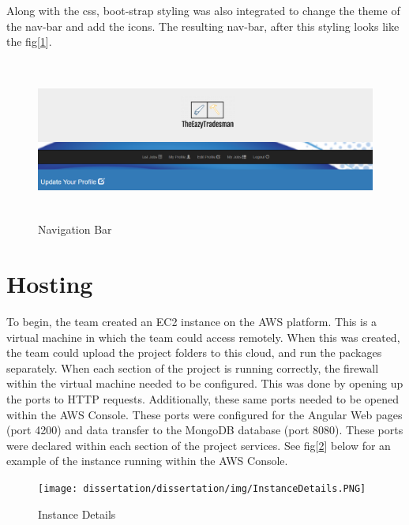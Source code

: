 \bigskip

Along with the css, boot-strap styling was also integrated to change the theme of the nav-bar and add the icons. The resulting nav-bar, after this styling looks like the fig[\ref{fig:nav}]. 

\begin{figure}[H]
    \centering
    \includegraphics[width=\textwidth, height=150pt]{DesignImages/navBar.PNG}
    \caption{Navigation Bar}
    \label{fig:nav}
\end{figure}

\bigskip



\section{Hosting}
\label{sec:SystemDesignHosting}
To begin, the team created an EC2 instance on the AWS platform. This is a virtual machine in which the team could access remotely. When this was created, the team could upload the project folders to this cloud, and run the packages separately. When each section of the project is running correctly, the firewall within the virtual machine needed to be configured. This was done by opening up the ports to HTTP requests. Additionally, these same ports needed to be opened within the AWS Console. These ports were configured for the Angular Web pages (port 4200) and data transfer to the MongoDB database (port 8080). These ports were declared within each section of the project services. See fig[\ref{fig:instance}] below for an example of the instance running within the AWS Console.

\begin{figure}[H]
    \centering
    \texttt{[image: dissertation/dissertation/img/InstanceDetails.PNG]}
    \caption{Instance Details}
    \label{fig:instance}
\end{figure}

